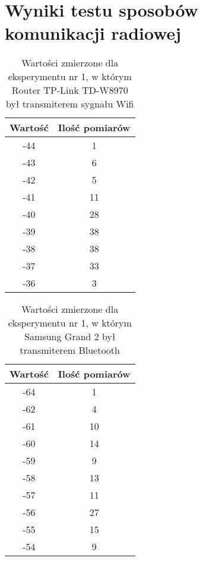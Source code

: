 \documentclass{article}
\begin{document}
	
\section{Wyniki testu sposobów komunikacji radiowej}

\begin{table}[H]
	\caption {Wartości zmierzone dla eksperymentu nr 1, w którym Router TP-Link TD-W8970 był transmiterem sygnału Wifi}
\begin{center}
		\begin{tabular}{|c|c|}
			\hline
			Wartość & Ilość pomiarów \\ 
			\hline
			-44 & 1\\
			\hline
			-43 & 6\\
			\hline
			-42 & 5\\
			\hline
			-41 & 11\\
			\hline
			-40 & 28\\
			\hline
			-39 & 38\\
			\hline
			-38 & 38\\
			\hline
			-37 & 33\\
			\hline
			-36 & 3\\
			\hline
		\end{tabular}
\end{center}
\end{table}
\begin{table}[H]
	\caption{Wartości zmierzone dla eksperymentu nr 1, w którym Samsung Grand 2 był  transmiterem Bluetooth}
\begin{center}
		\begin{tabular}{|c|c|}
			\hline
			Wartość & Ilość pomiarów \\ 
			\hline
			-64 & 1\\
			\hline
			-62 & 4\\
			\hline
			-61 & 10\\
			\hline
			-60 & 14\\
			\hline
			-59 & 9\\
			\hline
			-58 & 13\\
			\hline
			-57 & 11\\
			\hline
			-56 & 27\\
			\hline
			-55 & 15\\
			\hline
			-54 & 9\\
			\hline
		\end{tabular}
\end{center}
\end{table}
\end{document}
